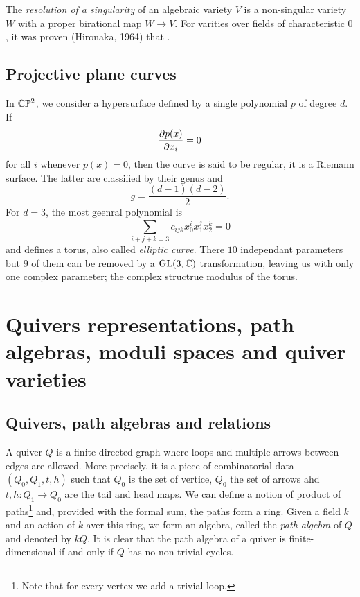         The \emph{resolution of a singularity} of an algebraic variety $V$ is a non-singular variety $W$ with a proper birational map $W\to V$. For varities over fields of characteristic $0$, it was proven (Hironaka, 1964) that .

    \subsection{Projective plane curves}

        In $\mathbb{C}\mathbb{P}^2$, we consider a hypersurface defined by a single polynomial $p$ of degree $d$. If
        \begin{equation}
            \pdv{p(x)}{x_i}=0
        \end{equation}
        for all $i$ whenever $p(x)=0$, then the curve is said to be regular, it is a Riemann surface. The latter are classified by their genus and
        \begin{equation}
            g=\frac{(d-1)(d-2)}{2}.
        \end{equation}
        For $d=3$, the most geenral polynomial is
        \begin{equation}
            \sum_{i+j+k=3}c_{ijk}x^i_0x^j_1x^k_2=0
        \end{equation}
        and defines a torus, also called \emph{elliptic curve}. There $10$ independant parameters but $9$ of them can be removed by a $\text{GL}(3,\mathbb{C})$ transformation, leaving us with only one complex parameter; the complex structrue modulus of the torus.

\section{Quivers representations, path algebras, moduli spaces and quiver varieties}

    \subsection{Quivers, path algebras and relations}

        A quiver $Q$ is a finite directed graph where loops and multiple arrows between edges are allowed. More precisely, it is a piece of combinatorial data $(Q_0,Q_1,t,h)$ such that $Q_0$ is the set of vertice, $Q_0$ the set of arrows ahd $t,h:Q_1\to Q_0$ are the tail and head maps. We can define a notion of product of paths\footnote{Note that for every vertex we add a trivial loop.} and, provided with the formal sum, the paths form a ring. Given a field $k$ and an action of $k$ aver this ring, we form an algebra, called the \emph{path algebra} of $Q$ and denoted by $kQ$. It is clear that the path algebra of a quiver is finite-dimensional if and only if $Q$ has no non-trivial cycles.

